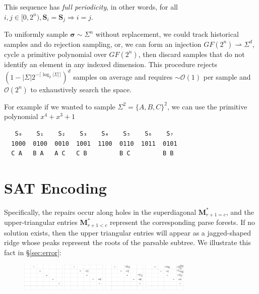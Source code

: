 \documentclass[sigplan,nonacm]{acmart}\settopmatter{printfolios=false,printccs=false,printacmref=false}
\begin{document}
\noindent This sequence has \textit{full periodicity}, in other words, for all $i, j \in [0, 2^n), \mathbf{S}_i = \mathbf{S}_j \Rightarrow i = j$.


To uniformly sample $\bm\sigma \sim \Sigma^n$ without replacement, we could track historical samples and do rejection sampling, or, we can form an injection $GF(2^n)\rightharpoonup\Sigma^d$, cycle a primitive polynomial over $GF(2^n)$, then discard samples that do not identify an element in any indexed dimension. This procedure rejects $(1 - |\Sigma|2^{-\lceil\log_2|\Sigma|\rceil})^d$ samples on average and requires $\sim\mathcal{O}(1)$ per sample and $\mathcal{O}(2^n)$ to exhaustively search the space.

For example if we wanted to sample $\Sigma^2 = \{A, B, C\}^2$, we can use the primitive polynomial $x^4 + x^3 +1$

\begin{verbatim}
   S₀    S₁    S₂    S₃    S₄    S₅    S₆    S₇
  1000  0100  0010  1001  1100  0110  1011  0101
  C A   B A   A C   C B         B C         B B
\end{verbatim}

\pagebreak
\section{SAT Encoding}\label{sec:sat}

Specifically, the repairs occur along holes in the superdiagonal $\mathbf{M}^*_{r+1 = c}$, and the upper-triangular entries $\mathbf{M}^*_{r + 1 < c}$ represent the corresponding parse forests. If no solution exists, then the upper triangular entries will appear as a jagged-shaped ridge whose peaks represent the roots of the parsable subtree. We illustrate this fact in \S\ref{sec:error}:

\begin{figure}[H]
    \includegraphics[width=2cm]{../figures/parse1.png}
    \includegraphics[width=2cm]{../figures/parse2.png}
    \includegraphics[width=2cm]{../figures/parse3.png}
    \includegraphics[width=2cm]{../figures/parse4.png}
\end{figure}
\end{document}
